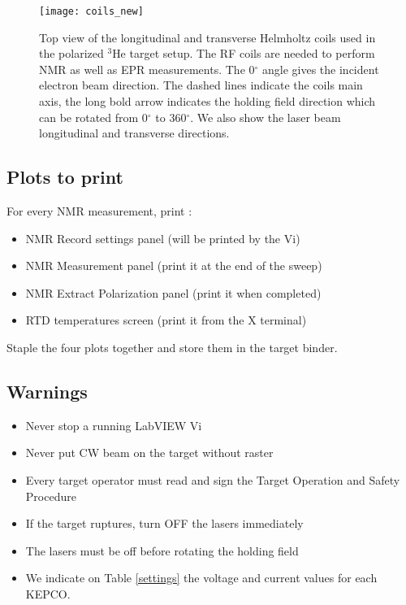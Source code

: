 {\begin{figure}
\begin{center}
\centerline{\texttt{[image: coils\_new]}}
\caption[Top view of the longitudinal and transverse Helmholtz coils]%
{Top view of the longitudinal and transverse Helmholtz coils
used in the polarized $^3$He target setup. 
The RF coils are needed to perform NMR as well as EPR measurements. The
0$^{\circ}$ angle gives the incident electron
beam direction. The
dashed lines indicate the coils main axis, the long bold 
arrow indicates the holding field direction which can be 
rotated from 0$^{\circ}$
to 360$^{\circ}$. We also show the laser beam
longitudinal and transverse directions.}
\label{fig:nmr}
\end{center}
\end{figure}

\subsection{Plots to print}

For every NMR measurement, print :

\begin{itemize}
\item{NMR Record settings panel (will be printed by the Vi)}
\item{NMR Measurement panel (print it at the end of the sweep)}
\item{NMR Extract Polarization panel (print it when completed)}
\item{RTD temperatures screen (print it from the X terminal)}
\end{itemize}

Staple the four plots together and store them in the target binder.

\subsection{Warnings}

\begin{itemize}
\item{Never stop a running LabVIEW Vi}
\item{Never put CW beam on the target without raster}
\item{Every target operator must read and sign the Target Operation and Safety 
Procedure}
\item{If the target ruptures, turn OFF the lasers immediately}
\item{The lasers must be off before rotating the holding field}
\item{We indicate on Table \ref{settings} the voltage and 
current values for each KEPCO.}
\end{itemize}

}
